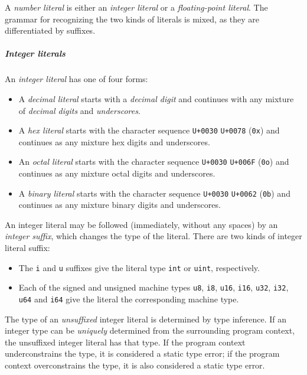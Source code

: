 \documentclass[]{article}
\begin{document}
A \emph{number literal} is either an \emph{integer literal} or a
\emph{floating-point literal}. The grammar for recognizing the two kinds
of literals is mixed, as they are differentiated by suffixes.

\subparagraph{Integer literals}\label{integer-literals}

An \emph{integer literal} has one of four forms:

\begin{itemize}
\itemsep1pt\parskip0pt
\item
  A \emph{decimal literal} starts with a \emph{decimal digit} and
  continues with any mixture of \emph{decimal digits} and
  \emph{underscores}.
\item
  A \emph{hex literal} starts with the character sequence
  \texttt{U+0030} \texttt{U+0078} (\texttt{0x}) and continues as any
  mixture hex digits and underscores.
\item
  An \emph{octal literal} starts with the character sequence
  \texttt{U+0030} \texttt{U+006F} (\texttt{0o}) and continues as any
  mixture octal digits and underscores.
\item
  A \emph{binary literal} starts with the character sequence
  \texttt{U+0030} \texttt{U+0062} (\texttt{0b}) and continues as any
  mixture binary digits and underscores.
\end{itemize}

An integer literal may be followed (immediately, without any spaces) by
an \emph{integer suffix}, which changes the type of the literal. There
are two kinds of integer literal suffix:

\begin{itemize}
\itemsep1pt\parskip0pt
\item
  The \texttt{i} and \texttt{u} suffixes give the literal type
  \texttt{int} or \texttt{uint}, respectively.
\item
  Each of the signed and unsigned machine types \texttt{u8},
  \texttt{i8}, \texttt{u16}, \texttt{i16}, \texttt{u32}, \texttt{i32},
  \texttt{u64} and \texttt{i64} give the literal the corresponding
  machine type.
\end{itemize}

The type of an \emph{unsuffixed} integer literal is determined by type
inference. If an integer type can be \emph{uniquely} determined from the
surrounding program context, the unsuffixed integer literal has that
type. If the program context underconstrains the type, it is considered
a static type error; if the program context overconstrains the type, it
is also considered a static type error.
\end{document}
